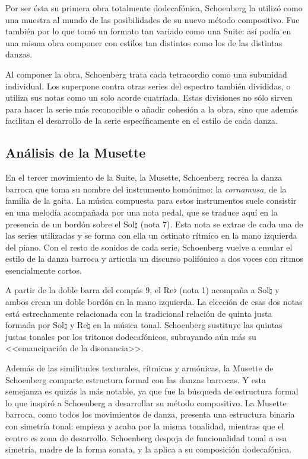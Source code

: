         Por ser ésta su primera obra totalmente dodecafónica, Schoenberg la utilizó como una muestra al mundo de las posibilidades de su nuevo método compositivo. Fue también por lo que tomó un formato tan variado como una Suite: así podía en una misma obra componer con estilos tan distintos como los de las distintas danzas.
        
        Al componer la obra, Schoenberg trata cada tetracordio como una subunidad individual. Los superpone contra otras series del espectro también divididas, o utiliza sus notas como un solo acorde cuatríada. Estas divisiones no sólo sirven para hacer la serie más reconocible o añadir cohesión a la obra, sino que además facilitan el desarrollo de la serie específicamente en el estilo de cada danza.
		
	\subsection{Análisis de la Musette}
	\label{musette}
		En el tercer movimiento de la Suite, la Musette, Schoenberg recrea la danza barroca que toma su nombre del instrumento homónimo: la \emph{cornamusa}, de la familia de la gaita. La música compuesta para estos instrumentos suele consistir en una melodía acompañada por una nota pedal, que se traduce aquí en la presencia de un bordón sobre el Sol$\natural$ (nota 7). Esta nota se extrae de cada una de las series utilizadas y se forma con ella un ostinato rítmico en la mano izquierda del piano. Con el resto de sonidos de cada serie, Schoenberg vuelve a emular el estilo de la danza barroca y articula un discurso polifónico a dos voces con ritmos esencialmente cortos.
		
		A partir de la doble barra del compás 9, el Re$\flat$ (nota 1) acompaña a Sol$\natural$ y ambos crean un doble bordón en la mano izquierda. La elección de esas dos notas está estrechamente relacionada con la tradicional relación de quinta justa formada por Sol$\natural$ y Re$\natural$ en la música tonal. Schoenberg sustituye las quintas justas tonales por los tritonos dodecafónicos, subrayando aún más su <<emancipación de la disonancia>>.
		
		Además de las similitudes texturales, rítmicas y armónicas, la Musette de Schoenberg comparte estructura formal con las danzas barrocas. Y esta semejanza es quizás la más notable, ya que fue la búsqueda de estructura formal lo que inspiró a Schoenberg a desarrollar su método compositivo. La Musette barroca, como todos los movimientos de danza, presenta una estructura binaria con simetría tonal: empieza y acaba por la misma tonalidad, mientras que el centro es zona de desarrollo. Schoenberg despoja de funcionalidad tonal a esa simetría, madre de la forma sonata, y la aplica a su composición dodecafónica.
		
